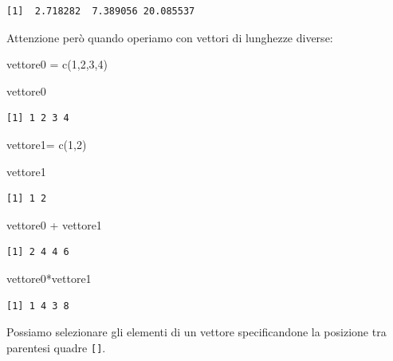 \documentclass[
  italian,
  letterpaper,
]{book}
\newenvironment{Shaded}{\begin{snugshade}}{\end{snugshade}}
\newcommand{\DecValTok}[1]{\textcolor[rgb]{0.68,0.00,0.00}{#1}}
\newcommand{\FunctionTok}[1]{\textcolor[rgb]{0.28,0.35,0.67}{#1}}
\newcommand{\NormalTok}[1]{\textcolor[rgb]{0.00,0.23,0.31}{#1}}
\newcommand{\OtherTok}[1]{\textcolor[rgb]{0.00,0.23,0.31}{#1}}
\newcommand{\SpecialCharTok}[1]{\textcolor[rgb]{0.37,0.37,0.37}{#1}}
\theoremstyle{definition}
\theoremstyle{remark}
\begin{document}
\begin{verbatim}
[1]  2.718282  7.389056 20.085537
\end{verbatim}

Attenzione però quando operiamo con vettori di lunghezze diverse:

\begin{Shaded}
\begin{Highlighting}[]
\NormalTok{vettore0 }\OtherTok{=} \FunctionTok{c}\NormalTok{(}\DecValTok{1}\NormalTok{,}\DecValTok{2}\NormalTok{,}\DecValTok{3}\NormalTok{,}\DecValTok{4}\NormalTok{)}

\NormalTok{vettore0}
\end{Highlighting}
\end{Shaded}

\begin{verbatim}
[1] 1 2 3 4
\end{verbatim}

\begin{Shaded}
\begin{Highlighting}[]
\NormalTok{vettore1}\OtherTok{=} \FunctionTok{c}\NormalTok{(}\DecValTok{1}\NormalTok{,}\DecValTok{2}\NormalTok{)}

\NormalTok{vettore1}
\end{Highlighting}
\end{Shaded}

\begin{verbatim}
[1] 1 2
\end{verbatim}

\begin{Shaded}
\begin{Highlighting}[]
\NormalTok{vettore0 }\SpecialCharTok{+}\NormalTok{ vettore1}
\end{Highlighting}
\end{Shaded}

\begin{verbatim}
[1] 2 4 4 6
\end{verbatim}

\begin{Shaded}
\begin{Highlighting}[]
\NormalTok{vettore0}\SpecialCharTok{*}\NormalTok{vettore1}
\end{Highlighting}
\end{Shaded}

\begin{verbatim}
[1] 1 4 3 8
\end{verbatim}

Possiamo selezionare gli elementi di un vettore specificandone la
posizione tra parentesi quadre \texttt{{[}{]}}.
\end{document}
